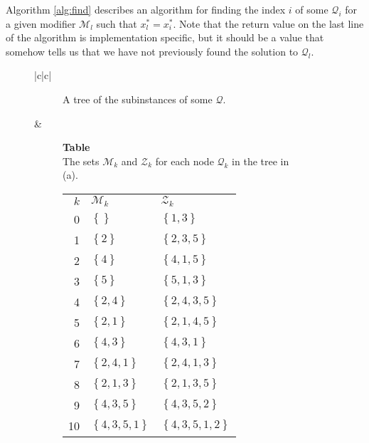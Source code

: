 Algorithm \ref{alg:find} describes
an algorithm for finding the index $i$ of some $\mathcal{Q}_i$ for a given
modifier $\mathcal{M}_l$ such that $x_l^* = x_i^*$. Note that the return value
on the last line of the algorithm is implementation specific, but it should be
a value that somehow tells us that we have not previously found the solution to
$\mathcal{Q}_l$.
\begin{figure}
    \centering
    \begin{tabular}{|c|c|}\hline
    \begin{subfigure}[b]{0.5\textwidth}
        
        \caption{A tree of the subinstances of some $\mathcal{Q}$.}
        \label{fig:mapgraph}
    \end{subfigure}
    & 
    \begin{subfigure}[b]{0.40\textwidth}
        \textbf{Table} \\
        The sets $\mathcal{M}_k$ and $\mathcal{Z}_k$ for each node
        $\mathcal{Q}_k$ in the tree in (a).
        \begin{tabular}{rll}
            $k$ & $\mathcal{M}_k$            & $\mathcal{Z}_k$ \\
            0        & $\left\{{}\right\}$        & $\left\{{1,3}\right\}$ \\ 
            1        & $\left\{{2}\right\}$       & $\left\{{2,3,5}\right\}$ \\ 
            2        & $\left\{{4}\right\}$       & $\left\{{4,1,5}\right\}$ \\ 
            3        & $\left\{{5}\right\}$       & $\left\{{5,1,3}\right\}$ \\ 
            4        & $\left\{{2,4}\right\}$     & $\left\{{2,4,3,5}\right\}$ \\ 
            5        & $\left\{{2,1}\right\}$     & $\left\{{2,1,4,5}\right\}$ \\ 
            6        & $\left\{{4,3}\right\}$     & $\left\{{4,3,1}\right\}$ \\ 
            7        & $\left\{{2,4,1}\right\}$   & $\left\{{2,4,1,3}\right\}$ \\ 
            8        & $\left\{{2,1,3}\right\}$   & $\left\{{2,1,3,5}\right\}$ \\ 
            9        & $\left\{{4,3,5}\right\}$   & $\left\{{4,3,5,2}\right\}$ \\ 
            10       & $\left\{{4,3,5,1}\right\}$ & $\left\{{4,3,5,1,2}\right\}$
        \end{tabular}
    \end{subfigure}
    \\ \hline
    \end{tabular}
\end{figure}



